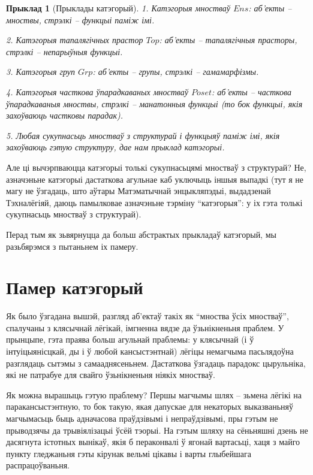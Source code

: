 \documentclass[a4paper,12pt]{book}
\newtheorem{example}{Прыклад}[section]
\begin{document}
\begin{example}[Прыклады катэгорый]
  1. Катэгорыя мностваў $Ens$: аб'екты -- мноствы, стрэлкі -- функцыі
  паміж імі.

  2. Катэгорыя тапалягічных прастор $Top$: аб'екты -- тапалягічныя
  прасторы, стрэлкі -- непарыўныя функцыі.

  3. Катэгорыя груп $Grp$: аб'екты -- групы, стрэлкі -- гамамарфізмы.

  4. Катэгорыя часткова ўпарадкаваных мностваў $Poset$: аб'екты --
  часткова ўпарадкаваныя мноствы, стрэлкі -- манатонныя функцыі (то
  бок функцыі, якія захоўваюць частковы парадак).

  5. Любая сукупнасьць мностваў з структурай і функцыяў паміж імі,
  якія захоўваюць гэтую структуру, дае нам прыклад катэгорыі.
\end{example}

Але ці вычэрпваюцца катэгорыі толькі сукупнасьцямі мностваў з
структурай? Не, азначэньне катэгорыі дастаткова агульнае каб уключыць
іншыя выпадкі (тут я не магу не ўзгадаць, што аўтары Матэматычнай
энцыкляпэдыі, выдадзенай Тэхналёгіяй, даюць памылковае азначэньне
тэрміну ``катэгорыя'': у іх гэта толькі сукупнасьць мностваў з
структурай).

Перад тым як зьвярнуцца да больш абстрактых прыкладаў катэгорый, мы
разьбярэмся з пытаньнем іх памеру.

\section{Памер катэгорый}

Як было ўзгадана вышэй, разгляд аб'ектаў такіх як ``мноства ўсіх
мностваў'', спалучаны з клясычнай лёгікай, імгненна вядзе да
ўзьнікненьня праблем. У прынцыпе, гэта праява больш агульнай праблемы:
у клясычнай (і ў інтуіцыянісцкай, ды і ў любой кансыстэнтнай) лёгіцы
немагчыма пасьлядоўна разглядаць сытэмы з самааднясеньнем. Дастаткова
ўзгадаць парадокс цырульніка, які не патрабуе для свайго ўзьнікненьня
ніякіх мностваў.

Як можна вырашыць гэтую праблему? Першы магчымы шлях -- зьмена лёгікі
на паракансыстэнтную, то бок такую, якая дапускае для некаторых
выказваньняў магчымасьць быць адначасова праўдзівымі і непраўдзівымі,
пры гэтым не прыводзячы да трывіялізацыі ўсёй тэорыі. На гэтым шляху
на сёньняшні дзень не дасягнута істотных вынікаў, якія б пераконвалі ў
ягонай вартасьці, хаця з майго пункту гледжаньня гэты кірунак вельмі
цікавы і варты глыбейшага распрацоўваньня.
\end{document}
